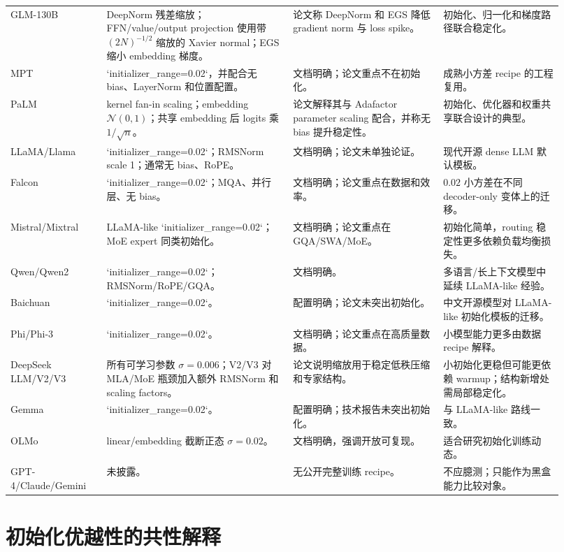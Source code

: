 \documentclass[UTF8,a4paper,11pt]{ctexart}
\newcommand{\Normal}{\mathcal{N}}
\begin{document}
\begin{longtable}{p{0.16\linewidth}p{0.31\linewidth}p{0.25\linewidth}p{0.20\linewidth}}
GLM-130B & DeepNorm 残差缩放；FFN/value/output projection 使用带 $(2N)^{-1/2}$ 缩放的 Xavier normal；EGS 缩小 embedding 梯度。 & 论文称 DeepNorm 和 EGS 降低 gradient norm 与 loss spike。 & 初始化、归一化和梯度路径联合稳定化。\\
MPT & `initializer\_range=0.02`，并配合无 bias、LayerNorm 和位置配置。 & 文档明确；论文重点不在初始化。 & 成熟小方差 recipe 的工程复用。\\
PaLM & kernel fan-in scaling；embedding $\Normal(0,1)$；共享 embedding 后 logits 乘 $1/\sqrt n$。 & 论文解释其与 Adafactor parameter scaling 配合，并称无 bias 提升稳定性。 & 初始化、优化器和权重共享联合设计的典型。\\
LLaMA/Llama & `initializer\_range=0.02`；RMSNorm scale 1；通常无 bias、RoPE。 & 文档明确；论文未单独论证。 & 现代开源 dense LLM 默认模板。\\
Falcon & `initializer\_range=0.02`；MQA、并行层、无 bias。 & 文档明确；论文重点在数据和效率。 & $0.02$ 小方差在不同 decoder-only 变体上的迁移。\\
Mistral/Mixtral & LLaMA-like `initializer\_range=0.02`；MoE expert 同类初始化。 & 文档明确；论文重点在 GQA/SWA/MoE。 & 初始化简单，routing 稳定性更多依赖负载均衡损失。\\
Qwen/Qwen2 & `initializer\_range=0.02`；RMSNorm/RoPE/GQA。 & 文档明确。 & 多语言/长上下文模型中延续 LLaMA-like 经验。\\
Baichuan & `initializer\_range=0.02`。 & 配置明确；论文未突出初始化。 & 中文开源模型对 LLaMA-like 初始化模板的迁移。\\
Phi/Phi-3 & `initializer\_range=0.02`。 & 文档明确；论文重点在高质量数据。 & 小模型能力更多由数据 recipe 解释。\\
DeepSeek LLM/V2/V3 & 所有可学习参数 $\sigma=0.006$；V2/V3 对 MLA/MoE 瓶颈加入额外 RMSNorm 和 scaling factors。 & 论文说明缩放用于稳定低秩压缩和专家结构。 & 小初始化更稳但可能更依赖 warmup；结构新增处需局部稳定化。\\
Gemma & `initializer\_range=0.02`。 & 配置明确；技术报告未突出初始化。 & 与 LLaMA-like 路线一致。\\
OLMo & linear/embedding 截断正态 $\sigma=0.02$。 & 文档明确，强调开放可复现。 & 适合研究初始化训练动态。\\
GPT-4/Claude/Gemini & 未披露。 & 无公开完整训练 recipe。 & 不应臆测；只能作为黑盒能力比较对象。\\
\bottomrule
\end{longtable}
\normalsize

\section{初始化优越性的共性解释}
\end{document}
